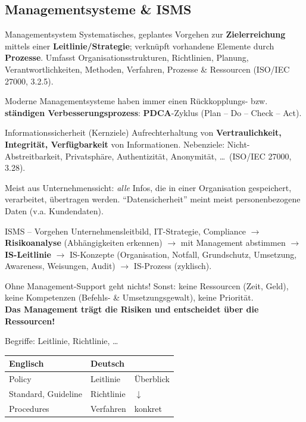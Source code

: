 \documentclass[a4paper, fontsize=7pt]{scrartcl}
\renewcommand*{\arraystretch}{1.5}  %
\begin{document}
\subsection{Managementsysteme \& ISMS}

\begin{mainbox}{Managementsystem}
Systematisches, geplantes Vorgehen zur \textbf{Zielerreichung} mittels einer
\textbf{Leitlinie/Strategie}; verknüpft vorhandene Elemente durch \textbf{Prozesse}.
Umfasst Organisationsstrukturen, Richtlinien, Planung, Verantwortlichkeiten,
Methoden, Verfahren, Prozesse \& Ressourcen (ISO/IEC 27000, 3.2.5).

Moderne Managementsysteme haben immer einen Rückkopplungs- bzw.
\textbf{ständigen Verbesserungsprozess}: \textbf{PDCA}-Zyklus
(Plan -- Do -- Check -- Act).
\end{mainbox}

\begin{mainbox}{Informationssicherheit (Kernziele)}
Aufrechterhaltung von \textbf{Vertraulichkeit, Integrität, Verfügbarkeit} von
Informationen. Nebenziele: Nicht-Abstreitbarkeit, Privatsphäre, Authentizität,
Anonymität, \ldots\ (ISO/IEC 27000, 3.28).

Meist aus Unternehmenssicht: \emph{alle} Infos, die in einer Organisation
gespeichert, verarbeitet, übertragen werden. ``Datensicherheit'' meint meist
personenbezogene Daten (v.a. Kundendaten).
\end{mainbox}

\begin{mainbox}{ISMS -- Vorgehen}
Unternehmensleitbild, IT-Strategie, Compliance $\to$ \textbf{Risikoanalyse}
(Abhängigkeiten erkennen) $\to$ mit Management abstimmen $\to$
\textbf{IS-Leitlinie} $\to$ IS-Konzepte (Organisation, Notfall, Grundschutz,
Umsetzung, Awareness, Weisungen, Audit) $\to$ IS-Prozess (zyklisch).
\end{mainbox}

\begin{mainbox}{Ohne Management-Support geht nichts!}
Sonst: keine Ressourcen (Zeit, Geld), keine Kompetenzen (Befehls- \&
Umsetzungsgewalt), keine Priorität.\\
\textbf{Das Management trägt die Risiken und entscheidet über die Ressourcen!}
\end{mainbox}

\begin{mainbox}{Begriffe: Leitlinie, Richtlinie, \ldots}
\renewcommand*{\arraystretch}{1.2}
\begin{center}
\begin{tabular}{l|l|l}
\textbf{Englisch} & \textbf{Deutsch} & \\
\hline
Policy & Leitlinie & Überblick \\
Standard, Guideline & Richtlinie & $\downarrow$ \\
Procedures & Verfahren & konkret \\
\end{tabular}
\end{center}
\end{mainbox}
\end{document}
